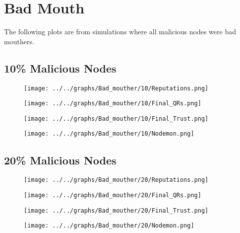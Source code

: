 \section*{Bad Mouth}
The following plots are from simulations where all malicious nodes were
bad mouthers.
\\
\begin{minipage}[t]{0.49\columnwidth}
\subsection*{10\% Malicious Nodes}
    \begin{figure}[H]
        \centering
        \texttt{[image: ../../graphs/Bad\_mouther/10/Reputations.png]}
    \end{figure}
    \begin{figure}[H]
        \centering
        \texttt{[image: ../../graphs/Bad\_mouther/10/Final\_QRs.png]}
    \end{figure}
\end{minipage}
\begin{minipage}[t]{0.49\columnwidth}
    \begin{figure}[H]
        \centering
        \texttt{[image: ../../graphs/Bad\_mouther/10/Final\_Trust.png]}
    \end{figure}
    \begin{figure}[H]
        \centering
        \texttt{[image: ../../graphs/Bad\_mouther/10/Nodemon.png]}
    \end{figure}
\end{minipage}

\begin{minipage}[t]{0.49\columnwidth}
\subsection*{20\% Malicious Nodes}
    \begin{figure}[H]
        \centering
        \texttt{[image: ../../graphs/Bad\_mouther/20/Reputations.png]}
    \end{figure}
    \begin{figure}[H]
        \centering
        \texttt{[image: ../../graphs/Bad\_mouther/20/Final\_QRs.png]}
    \end{figure}
\end{minipage}
\begin{minipage}[t]{0.49\columnwidth}
    \begin{figure}[H]
        \centering
        \texttt{[image: ../../graphs/Bad\_mouther/20/Final\_Trust.png]}
    \end{figure}
    \begin{figure}[H]
        \centering
        \texttt{[image: ../../graphs/Bad\_mouther/20/Nodemon.png]}
    \end{figure}
\end{minipage}

